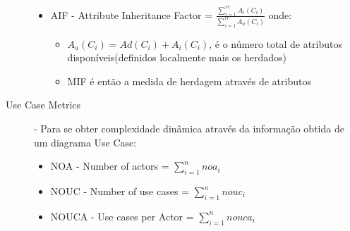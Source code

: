 \begin{description}
\begin{itemize}
\begin{itemize}
				                                                                                                               \end{itemize}
				   \item AIF - Attribute Inheritance Factor = $ \frac{\sum_{i=1}^{rc} A_i(C_i)}{\sum_{i=1}^{rc} A_a(C_i)} $ onde: \begin{itemize}
				                                                                                                                \item $ A_a(C_i) = Ad(C_i) + A_i(C_i)$, é o número total de atributos disponíveis(definidos localmente mais os herdados)
				                                                                                                                \item MIF é então a medida de herdagem através de atributos
				                                                                                                               \end{itemize}

                                  \end{itemize}
 \item [Use Case Metrics] - Para se obter complexidade dinâmica através da informação obtida de um diagrama Use Case:\begin{itemize}
                             \item NOA - Number of actors = $ \sum_{i=1}^{n} noa_i $
                             \item NOUC - Number of use cases = $ \sum_{i=1}^{n} nouc_i $
                             \item NOUCA - Use cases per Actor = $ \sum_{i=1}^{n} nouca_i $
                            \end{itemize}
  
\end{description}
